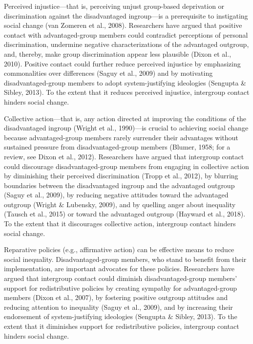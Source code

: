 \documentclass[twocolumn, 11pt, letterpaper]{article}
\begin{document}
Perceived injustice---that is, perceiving unjust group-based deprivation
or discrimination against the disadvantaged ingroup---is a prerequisite
to instigating social change (van Zomeren et al., 2008). Researchers
have argued that positive contact with advantaged-group members could
contradict perceptions of personal discrimination, undermine negative
characterizations of the advantaged outgroup, and, thereby, make group
discrimination appear less plausible (Dixon et al., 2010). Positive
contact could further reduce perceived injustice by emphasizing
commonalities over differences (Saguy et al., 2009) and by motivating
disadvantaged-group members to adopt system-justifying ideologies
(Sengupta \& Sibley, 2013). To the extent that it reduces perceived
injustice, intergroup contact hinders social change.

Collective action---that is, any action directed at improving the
conditions of the disadvantaged ingroup (Wright et al., 1990)---is
crucial to achieving social change because advantaged-group members
rarely surrender their advantages without sustained pressure from
disadvantaged-group members (Blumer, 1958; for a review, see Dixon et
al., 2012). Researchers have argued that intergroup contact could
discourage disadvantaged-group members from engaging in collective
action by diminishing their perceived discrimination (Tropp et al.,
2012), by blurring boundaries between the disadvantaged ingroup and the
advantaged outgroup (Saguy et al., 2009), by reducing negative attitudes
toward the advantaged outgroup (Wright \& Lubensky, 2009), and by
quelling anger about inequality (Tausch et al., 2015) or toward the
advantaged outgroup (Hayward et al., 2018). To the extent that it
discourages collective action, intergroup contact hinders social change.

Reparative policies (e.g., affirmative action) can be effective means to
reduce social inequality. Disadvantaged-group members, who stand to
benefit from their implementation, are important advocates for these
policies. Researchers have argued that intergroup contact could diminish
disadvantaged-group members' support for redistributive policies by
creating sympathy for advantaged-group members (Dixon et al., 2007), by
fostering positive outgroup attitudes and reducing attention to
inequality (Saguy et al., 2009), and by increasing their endorsement of
system-justifying ideologies (Sengupta \& Sibley, 2013). To the extent
that it diminishes support for redistributive policies, intergroup
contact hinders social change.
\end{document}
